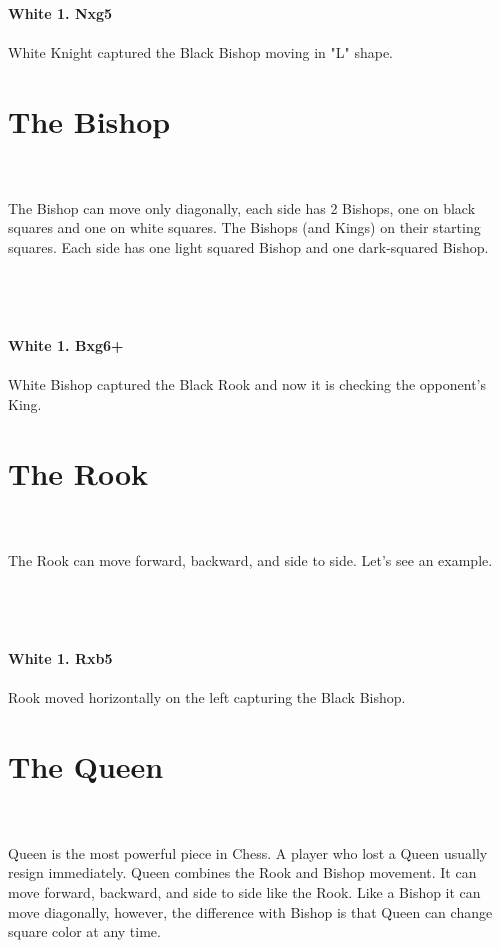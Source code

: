 \documentclass{article}
\begin{document}
\\

\\
\\
\textbf{White 1. Nxg5}\\
\\
White Knight captured the Black Bishop moving in "L" shape.\section{ The Bishop}

\\
\\
The Bishop can move only diagonally, each side has 2 Bishops, one on black squares and one on white squares. The Bishops (and Kings) on their starting squares. Each side has one light squared Bishop and one dark-squared Bishop.\\\\
\\

\\
\\
\textbf{White 1. Bxg6+}\\
\\
White Bishop captured the Black Rook and now it is checking the opponent's King.\section{ The Rook}

\\
\\
The Rook can move forward, backward, and side to side. Let's see an example.\\\\
\\

\\
\\
\textbf{White 1. Rxb5}\\
\\
Rook moved horizontally on the left capturing the Black Bishop.\section{ The Queen}

\\
\\
Queen is the most powerful piece in Chess. A player who lost a Queen usually resign immediately. Queen combines the Rook and Bishop movement. It can move forward, backward, and side to side like the Rook. Like a Bishop it can move diagonally, however, the difference with Bishop is that Queen can change square color at any time.\\\\
\end{document}
